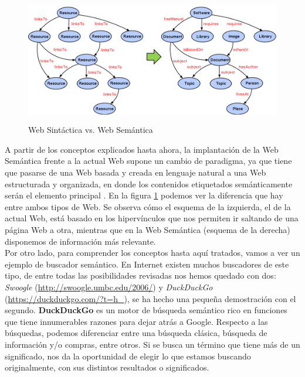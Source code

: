 \begin{figure}[H]
	\centering
	\includegraphics[height=5.6cm]{imagenes/capitulo3/web-actual-web-semantica.png}
	\caption{Web Sintáctica vs. Web Semántica \cite{imagen-diferencia}}
	\label{wa-ws}
\end{figure}

A partir de los conceptos explicados hasta ahora, la implantación de la Web Semántica frente a la actual Web supone un cambio de paradigma, ya que tiene que pasarse de una Web basada y creada en lenguaje natural a una Web estructurada y organizada, en donde los contenidos etiquetados semánticamente serán el elemento principal \cite{researchgate}. En la figura \ref{wa-ws} podemos ver la diferencia que hay entre ambos tipos de Web. Se observa cómo el esquema de la izquierda, el de la actual Web, está basado en los hipervínculos que nos permiten ir saltando de una página Web a otra, mientras que en la Web Semántica (esquema de la derecha) disponemos de información más relevante.\\



Por otro lado, para comprender los conceptos hasta aquí tratados, vamos a ver un ejemplo de buscador semántico. En Internet existen muchos buscadores de este tipo, de entre todas las posibilidades revisadas \cite{buscadores-semanticos} nos hemos quedado con dos: \textit{Swoogle} (\url{http://swoogle.umbc.edu/2006/}) y \textit{DuckDuckGo} (\url{https://duckduckgo.com/?t=h_}), se ha hecho una pequeña demostración con el segundo. \textbf{DuckDuckGo} es un motor de búsqueda semántico rico en funciones que tiene innumerables razones para dejar atrás a Google. Respecto a las búsquedas, podemos diferenciar entre una búsqueda clásica, búsqueda de información y/o compras, entre otros. Si se busca un término que tiene más de un significado, nos da la oportunidad de elegir lo que estamos buscando originalmente, con sus distintos resultados o significados. 

